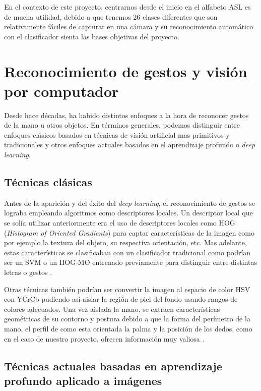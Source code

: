 En el contexto de este proyecto, centrarnos desde el inicio en el alfabeto ASL es de mucha utilidad, debido a que tenemos 26 clases diferentes que son relativamente fáciles de capturar en una cámara y su reconocimiento automático con el clasificador sienta las bases objetivas del proyecto.


\section{Reconocimiento de gestos y visión por computador}\label{reconocimiento-de-gestos-y-visión-por-computador}

Desde hace décadas, ha habido distintos enfoques a la hora de reconocer gestos de la mano u otros objetos. En términos generales, podemos distinguir entre enfoques clásicos basados en técnicas de visión artificial mas primitivos y tradicionales y otros enfoques actuales basados en el aprendizaje profundo o \textit{deep learning}.

\subsection{Técnicas clásicas}\label{tecnicas-clasicas}
Antes de la aparición y del éxito del \textit{deep learning}, el reconocimiento de gestos se lograba empleando algoritmos como descriptores locales. Un descriptor local  que se solía utilizar anteriormente era el uso de descriptores locales como HOG (\textit{Histogram of Oriented Gradients}) para captar características de la imagen como por ejemplo la textura del objeto, su respectiva orientación, etc. Mas adelante, estas características se clasificaban con un clasificador tradicional como podrían ser un SVM o un HOG-MO entrenado previamente para distinguir entre distintas letras o gestos \cite{art:hog_hog-mo}.

Otras técnicas también podrían ser convertir la imagen al espacio de color HSV con YCrCb pudiendo así aislar la región de piel del fondo usando rangos de colores adecuados. Una vez aislada la mano, se extraen características geométricas de su contorno y postura debido a que la forma del perímetro de la mano, el perfil de como esta orientada la palma y la posición de los dedos, como en el caso de nuestro proyecto, ofrecen información muy valiosa \cite{art:color_piel}.

\subsection{Técnicas actuales basadas en aprendizaje profundo aplicado a imágenes}\label{tecnicas-actuales}

